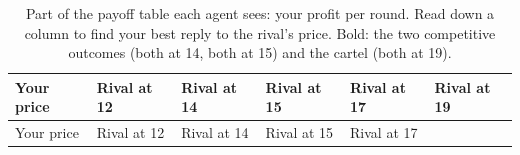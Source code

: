 \documentclass[10pt,letterpaper]{article}
\begin{document}
\begin{longtable}[]{@{}
  >{\raggedright\arraybackslash}p{}
  >{\raggedleft\arraybackslash}p{}
  >{\raggedleft\arraybackslash}p{}
  >{\raggedleft\arraybackslash}p{}
  >{\raggedleft\arraybackslash}p{}
  >{\raggedleft\arraybackslash}p{}@{}}
\caption{Part of the payoff table each agent sees: your profit per
round. Read down a column to find your best reply to the rival's price.
Bold: the two competitive outcomes (both at 14, both at 15) and the
cartel (both at 19).}\tabularnewline
\toprule\noalign{}
\begin{minipage}[b]{\linewidth}\raggedright
Your price
\end{minipage} & \begin{minipage}[b]{\linewidth}\raggedleft
Rival at 12
\end{minipage} & \begin{minipage}[b]{\linewidth}\raggedleft
Rival at 14
\end{minipage} & \begin{minipage}[b]{\linewidth}\raggedleft
Rival at 15
\end{minipage} & \begin{minipage}[b]{\linewidth}\raggedleft
Rival at 17
\end{minipage} & \begin{minipage}[b]{\linewidth}\raggedleft
Rival at 19
\end{minipage} \\
\midrule\noalign{}
\endfirsthead
\toprule\noalign{}
\begin{minipage}[b]{\linewidth}\raggedright
Your price
\end{minipage} & \begin{minipage}[b]{\linewidth}\raggedleft
Rival at 12
\end{minipage} & \begin{minipage}[b]{\linewidth}\raggedleft
Rival at 14
\end{minipage} & \begin{minipage}[b]{\linewidth}\raggedleft
Rival at 15
\end{minipage} & \begin{minipage}[b]{\linewidth}\raggedleft
Rival at 17
\end{minipage} & \begin{minipage}[b]{\linewidth}\raggedleft

\end{minipage}
\end{longtable}
\end{document}
